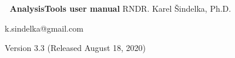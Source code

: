 
\makeatletter
\def\@makechapterhead#1{
  {\parindent \z@ \raggedright \normalfont
   \vspace*{30pt}
   \Huge\bfseries \thechapter. #1
   \par\nobreak
   \vskip 20\p@
}}
\def\@makeschapterhead#1{
  {\parindent \z@ \raggedright \normalfont
   \Huge\bfseries #1
   \par\nobreak
   \vskip 20\p@
}}
\makeatother %
\def\chapwithtoc#1{
\chapter*{#1}
\addcontentsline{toc}{chapter}{#1}
} %

\setcounter{secnumdepth}{2}
\setcounter{tocdepth}{2}

\setcounter{topnumber}{2}
\setcounter{bottomnumber}{2}
\setcounter{totalnumber}{4}
\renewcommand{\topfraction}{0.9}
\renewcommand{\bottomfraction}{0.8}
\renewcommand{\textfraction}{0.07}
\renewcommand{\floatpagefraction}{0.7}

\let\tt\useless
\newcommand{\tt}{\texttt}
\newcommand{\vcf}{\texttt{vcf} }
\newcommand{\vsf}{\texttt{vsf} }
\newcommand{\vscf}{\texttt{vsf/vcf} }
\newcommand{\vtf}{\texttt{vtf} }
\newcommand{\field}{\texttt{FIELD} }
\newcommand{\data}{\texttt{data} }




\begin{center}
\thispagestyle{empty}
\textcolor{white}{.}
\vfill
\vfill
\vfill
{\Huge\bf AnalysisTools user manual}
\vfill
{\Large RNDR. Karel Šindelka, Ph.D.}

{\small k.sindelka@gmail.com}
\vspace{10pt}

\vfill
Version 3.3 (Released August 18, 2020)
\vfill
\vfill
\vfill
\vfill
\vfill
\end{center}

\pagestyle{main}
\tableofcontents

\setcounter{page}{1}








%
%
%
%
%  

